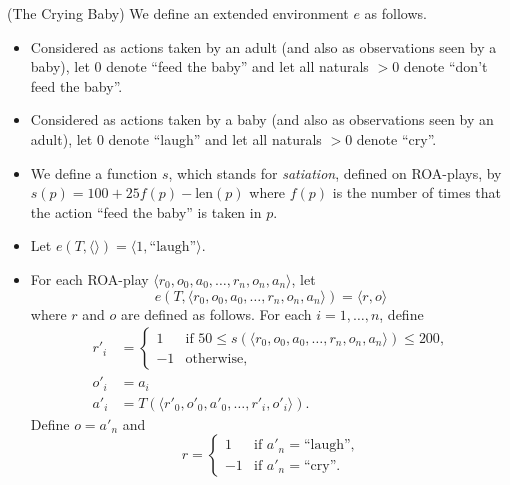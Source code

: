 \documentclass[runningheads]{llncs}
\begin{document}
\begin{example}
\label{cryingbabyexample}
    (The Crying Baby)
    We define an extended environment $e$ as follows.
    \begin{itemize}
        \item
        Considered as actions taken by an adult
        (and also as observations seen by a baby), let $0$ denote ``feed the baby''
        and let all naturals $>0$ denote ``don't feed the baby''.
        \item
        Considered as actions taken by a baby
        (and also as observations seen by an adult), let $0$ denote ``laugh'' and let
        all naturals $>0$ denote ``cry''.
        \item
        We define a function $s$, which stands for \emph{satiation}, defined on
        ROA-plays, by $s(p)=100+25f(p)-\mbox{len}(p)$ where $f(p)$ is the number of
        times that the action ``feed the baby'' is taken in $p$.
        \item
        Let $e(T,\langle\rangle)=\langle 1,\mbox{``laugh''}\rangle$.
        \item
        For each ROA-play $\langle r_0,o_0,a_0,\ldots,r_n,o_n,a_n\rangle$,
        let
        \[
            e(T,\langle r_0,o_0,a_0,\ldots,r_n,o_n,a_n\rangle)
            =
            \langle r,o\rangle
        \]
        where $r$ and $o$ are defined as follows.
        For each $i=1,\ldots,n$, define
        \begin{align*}
            r'_i &=
                \begin{cases}
                    1 &
                    \mbox{if
                    $50\leq s(\langle r_0,o_0,a_0,\ldots,r_n,o_n,a_n\rangle)\leq 200$,}\\
                    -1 & \mbox{otherwise,}
                \end{cases}\\
            o'_i &= a_i\\
            a'_i &= T(\langle r'_0,o'_0,a'_0,\ldots,r'_i,o'_i\rangle).
        \end{align*}
        Define $o=a'_n$ and
        \[
            r =
            \begin{cases}
                1 & \mbox{if $a'_n=\mbox{``laugh''}$,}\\
                -1 &\mbox{if $a'_n=\mbox{``cry''}$.}
            \end{cases}
        \]
    \end{itemize}
\end{example}
\end{document}
